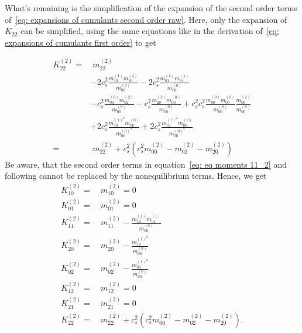 What's remaining is the simplification of the expansion of the second order terms of~\eqref{eq: expansions of cumulants second order raw}.
Here, only the expansion of $K_{22}$ can be simplified, using the same equations like in the derivation of~\eqref{eq: expansions of cumulants first order} to get

\begin{equation*}
  \begin{aligned}
    K_{22}^{(2)}
    = &\
    m_{22}^{(2)}
    \\&
    - 2 c_s^2 \frac{ m_{10}^{(1)} m_{10}^{(1)} }{m_{00}^{(0)}}
    - 2 c_s^2 \frac{ m_{01}^{(1)} m_{01}^{(1)} }{m_{00}^{(0)}}
    \\&
    - c_s^2\frac{  m_{00}^{(0)} m_{02}^{(2)} }{m_{00}^{(0)}}
    - c_s^2\frac{  m_{20}^{(2)} m_{00}^{(0)} }{m_{00}^{(0)}}
    + c_s^2 c_s^2 \frac{ m_{00}^{(0)} m_{00}^{(0)} }{m_{00}^{(0)}}\frac{ m_{00}^{(2)} }{m_{00}^{(0)}}
    \\&
    + 2 c_s^2 \frac{ m_{10}^{{(1)}^2} m_{00}^{(0)} }{m_{00}^{{(0)}^2}}
    + 2 c_s^2 \frac{ m_{01}^{{(1)}^2} m_{00}^{(0)} }{m_{00}^{{(0)}^2}}
    \\= &\
    m_{22}^{(2)}
    + c_s^2\left(c_s^2 m_{00}^{(2)}
    - m_{02}^{(2)}
    - m_{20}^{(2)}
    \right)
  \end{aligned}
\end{equation*}
Be aware, that the second order terms in equation~\eqref{eq: eq moments 11_2} and following cannot be replaced by the nonequilibrium terms.
Hence, we get
\begin{equation}
  \label{eq: expansions of cumulants second order}
  \begin{aligned}
    K_{10}^{(2)} =&\ m_{10}^{(2)} = 0\\
    K_{01}^{(2)} =&\ m_{01}^{(2)} = 0\\
    K_{11}^{(2)} =&\ m_{11}^{(2)} - \frac{ m_{10}^{(1)}m_{01}^{(1)}}{m_{00}^{(0)}} \\
    K_{20}^{(2)} =&\ m_{20}^{(2)} - \frac{ m_{10}^{{(1)}^2}}{m_{00}^{(0)}} \\
    K_{02}^{(2)} =&\ m_{02}^{(2)} - \frac{ m_{01}^{{(1)}^2}}{m_{00}^{(0)}} \\
    K_{12}^{(2)} =&\ m_{12}^{(2)} = 0\\
    K_{21}^{(2)} =&\ m_{21}^{(2)} = 0\\
    K_{22}^{(2)} =&\
    m_{22}^{(2)}
    + c_s^2\left(c_s^2 m_{00}^{(2)}
    - m_{02}^{(2)}
    - m_{20}^{(2)}
    \right).
  \end{aligned}
\end{equation}
